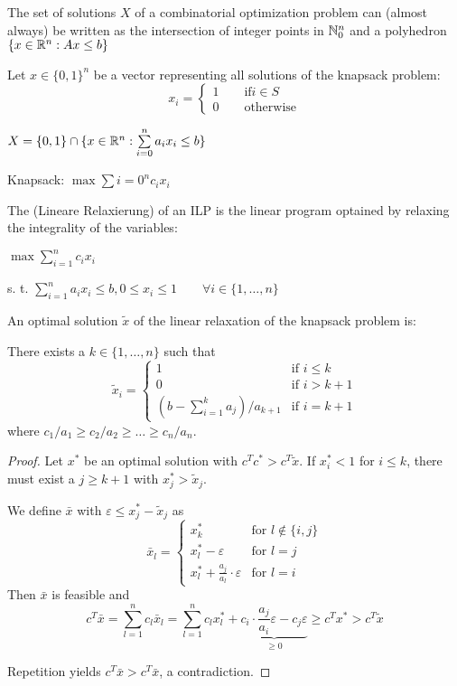 The set of solutions $X$ of a combinatorial optimization problem can (almost always) be written as the intersection of integer points in $\mathbb{N}_0^n$ and a polyhedron $\{x \in \mathbb{R}^n: Ax\leq b\}$

Let $x \in \{0,1\}^n$ be a vector representing all solutions of the knapsack problem:
\[
	x_i = \begin{cases}
		1 \qquad \text{if} i \in S \\
		0 \qquad \text{otherwise}
	\end{cases}
\]

$X = \{0,1\} \cap \{ x \in \mathbb{R}^n: \sum\limits_{i = 0}^n a_ix_i\leq b\}$

Knapsack: $\max \sum{i = 0}^n c_i x_i$

The  (Lineare Relaxierung) of an ILP is the linear program optained by relaxing the integrality of the variables:

$\max \sum_{i=1}^n c_i x_i$

s. t. $\sum_{i=1}^n a_i x_i \leq b, 0 \leq x_i \leq 1 \qquad \forall i \in \{1, …, n\}$

\begin{thm}
An optimal solution $\tilde{x}$ of the linear relaxation of the knapsack
problem is:

There exists a $k \in \{1, …, n\}$ such that 
\[
\tilde{x}_i = \left \{ \begin{array}{ll}
1 & \text{if } i \leq k \\ 
0 & \text{if } i > k+1 \\
(b-\sum^k_{i=1} a_j) / a_{k+1} & \text{if } i=k+1
\end{array} \right.
\]
where $c_1/a_1 \geq c_2 / a_2 \geq … \geq c_n / a_n$.
\end{thm}

\begin{proof}
Let $x^*$ be an optimal solution with $c^T c^* > c^T \tilde{x}$.
If $x^*_i < 1$ for $i \leq k$, there must exist a $j \geq k+1$ with $x^*_j >
\tilde{x}_j$.

We define $\bar{x}$ with $\varepsilon \leq x^*_j - \tilde{x}_j$ as
\[
\bar{x}_l = \left \{ \begin{array}{ll}
x^*_k & \text{for } l \not\in \{i, j\} \\
x^*_l - \varepsilon & \text{for } l=j \\
x^*_l + \frac{a_j}{a_l} \cdot \varepsilon & \text{for } l=i
\end{array} \right.
\]
Then $\bar{x}$ is feasible and
\[
c^T \bar{x} = \sum_{l=1}^n c_l \bar{x}_l =
\sum_{l=1}^n c_l x^*_l + \underbrace{c_i \cdot \frac{a_j}{a_i} \varepsilon - c_j
\varepsilon}_{\geq 0} \geq c^T x^* > c^T \tilde{x}
\]

Repetition yields $c^T \bar{x} > c^T \bar{x}$, a contradiction.
\end{proof}


